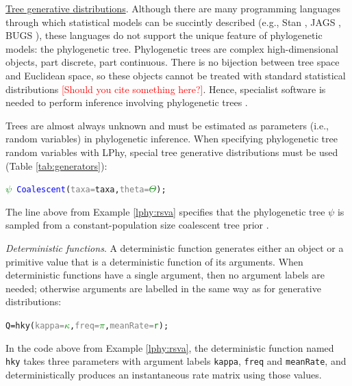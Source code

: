 \documentclass[10pt,letterpaper,table]{article}
\begin{document}
\noindent \ul{Tree generative distributions}. Although there are many
programming languages through which statistical 
models can be succintly described (e.g., Stan
\cite{carpenter2017stan}, JAGS \cite{plummer2003jags}, BUGS
\cite{lunn2009bugs, gilks1994language}), these languages do not
support the unique feature of phylogenetic models: the phylogenetic
tree.
Phylogenetic trees are complex high-dimensional objects, part
discrete, part continuous.
There is no bijection between tree space and Euclidean space, so these
objects cannot be treated with standard statistical distributions
\textcolor{red}{[Should you cite something here?]}.
Hence, specialist software is needed to perform inference
involving phylogenetic trees
\cite{hohna2016revbayes,bouckaert2019beastanalysis}.

Trees are almost always unknown and must be estimated as parameters
(i.e., random variables) in phylogenetic inference.
When specifying phylogenetic tree random variables with LPhy, special
tree generative distributions must be used (Table
\ref{tab:generators}):

{\small
  \begin{alltt}
    \textcolor{green}{\(\psi\)} ~ \textcolor{blue}{Coalescent}(\textcolor{gray}{taxa=}taxa, \textcolor{gray}{theta=}\textcolor{green}{\(\Theta\)});
  \end{alltt}
}

The line above from Example \ref{lphy:rsva} specifies that the
phylogenetic tree \texttt{$\psi$} is sampled from a
constant-population size coalescent tree prior \cite{kingman82}.
\newline

\noindent \emph{Deterministic functions}. A deterministic function
generates either an object or a primitive value that is a
deterministic function of its arguments.
When deterministic functions have a single argument, then no argument
labels are needed; otherwise arguments are labelled in the same way as
for generative distributions:

{\small
\begin{alltt}
  Q = \textcolor{magenta!80!black}{hky}(\textcolor{gray}{kappa=}\textcolor{green}{\(\kappa\)}, \textcolor{gray}{freq=}\textcolor{green}{\(\pi\)}, \textcolor{gray}{meanRate=}\textcolor{green}{r});
\end{alltt}
}

In the code above from Example \ref{lphy:rsva}, the deterministic
function named \texttt{hky} takes three parameters with argument
labels \texttt{kappa}, \texttt{freq} and \texttt{meanRate}, and
deterministically produces an instantaneous rate matrix using those
values.\newline
\end{document}
